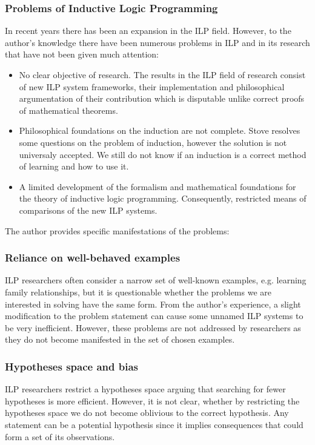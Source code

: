 \subsubsection{Problems of Inductive Logic Programming}
In recent years there has been an expansion in the ILP field. However, to the author's knowledge there have been numerous problems in ILP and in its research that have not been given much attention:

\begin{itemize}
\item No clear objective of research. The results in the ILP field of research consist of new ILP system frameworks, their implementation and philosophical argumentation of their contribution which is disputable unlike correct proofs of mathematical theorems.
\item Philosophical foundations on the induction are not complete. Stove \cite{stove1986} resolves some questions on the problem of induction, however the solution is not universaly accepted. We still do not know if an induction is a correct method of learning and how to use it.
\item A limited development of the formalism and mathematical foundations for the theory of inductive logic programming. Consequently, restricted means of comparisons of the new ILP systems.
\end{itemize}

The author provides specific manifestations of the problems:

\subsubsection{Reliance on well-behaved examples}
ILP researchers often consider a narrow set of well-known examples, e.g. learning family relationships, but it is questionable whether the problems we are interested in solving have the same form. From the author's experience, a slight modification to the problem statement can cause some unnamed ILP systems to be very inefficient. However, these problems are not addressed by researchers as they do not become manifested in the set of chosen examples.

\subsubsection{Hypotheses space and bias}
ILP researchers restrict a hypotheses space arguing that searching for fewer hypotheses is more efficient. However, it is not clear, whether by restricting the hypotheses space we do not become oblivious to the correct hypothesis. Any statement can be a potential hypothesis since it implies consequences that could form a set of its observations.

